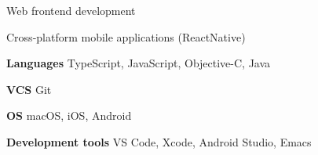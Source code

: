 \documentclass[11pt,a4paper,sans]{awesomecv}
\begin{document}
\makecvheader[C]

\let\bodyfont\cambria

\newcommand{\cvlistitem}[1]{\item {\fontsize{12pt}{1em}\bodyfont\upshape\color{darktext} #1}}
\newenvironment{cvlist}{
  \begin{description}[
      itemindent=0em,
      labelwidth=0em,
      labelsep=0em,
      leftmargin=0em,
      parsep=1ex
    ]
}{
  \end{description}
}

\newcommand{\cvdescriptionitem}[2]{\item[{\fontsize{12pt}{1em}\bodyfont\bfseries\color{darktext} #1}] {\fontsize{12pt}{1em}\cambria\upshape\color{darktext} #2}}
\newenvironment{cvdescription}{
  \begin{description}[
      parsep=1ex,
    ]
}{
  \end{description}
}

\begin{cvlist}
  \cvlistitem{Web frontend development}
  \cvlistitem{Cross-platform mobile applications (ReactNative)}
\end{cvlist}

\begin{cvdescription}
\cvdescriptionitem{Languages}{TypeScript, JavaScript, Objective-C, Java}
\cvdescriptionitem{VCS}{Git}
\cvdescriptionitem{OS}{macOS, iOS, Android}
\cvdescriptionitem{Development tools}{VS Code, Xcode, Android Studio, Emacs}
\end{cvdescription}

\renewcommand*{\entrypositionstyle}[1]{{\fontsize{12pt}{1em}\bodyfont\bfseries\color{darktext} #1}}
\renewcommand*{\entrydatestyle}[1]{{\fontsize{11pt}{1em}\bodyfont\slshape\color{graytext} #1}}
\newcommand*{\entryemployerstyle}[1]{{\fontsize{11pt}{1em}\bodyfont\bfseries\color{graytext} #1}}
\newcommand*{\entryurlstyle}[1]{{\fontsize{11pt}{1em}\bodyfont\upshape\color{graytext} #1}}
\newcommand*{\entrydescriptionstyle}[1]{{\fontsize{12pt}{1em}\bodyfont\upshape\color{text} #1}}

\renewcommand*{\cventry}[5]{
  \setlength\tabcolsep{0pt}
  \setlength{\extrarowheight}{1ex}
  \begin{tabular*}{\textwidth}{@{\extracolsep{\fill}} l r}
    \noalign{\vspace{-2ex}}
    \entrypositionstyle{#1} & \entrydatestyle{#2} \\
    \entryemployerstyle{#3} & \entryurlstyle{\url{#4}} \\
    \multicolumn{2}{L{\textwidth}}{
      \entrydescriptionstyle{#5}
    }
  \end{tabular*}
}
\end{document}
